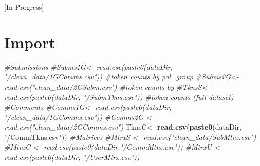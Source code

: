 \documentclass[
]{book}
\newenvironment{Shaded}{\begin{snugshade}}{\end{snugshade}}
\newcommand{\CommentTok}[1]{\textcolor[rgb]{0.56,0.35,0.01}{\textit{#1}}}
\newcommand{\DataTypeTok}[1]{\textcolor[rgb]{0.13,0.29,0.53}{#1}}
\newcommand{\KeywordTok}[1]{\textcolor[rgb]{0.13,0.29,0.53}{\textbf{#1}}}
\newcommand{\NormalTok}[1]{#1}
\newcommand{\OperatorTok}[1]{\textcolor[rgb]{0.81,0.36,0.00}{\textbf{#1}}}
\newcommand{\OtherTok}[1]{\textcolor[rgb]{0.56,0.35,0.01}{#1}}
\newcommand{\StringTok}[1]{\textcolor[rgb]{0.31,0.60,0.02}{#1}}
\begin{document}
{[}In-Progress{]}

\begin{Shaded}
\end{Shaded}

\hypertarget{import}{%
\section{Import}\label{import}}

\begin{Shaded}
\begin{Highlighting}[]
\CommentTok{#Submissions}
\CommentTok{#Subms1G<- read.csv(paste0(dataDir, "/clean_data/1GComms.csv")) #token counts by pol_group}
\CommentTok{#Subms2G<- read.csv("clean_data/2GSubm.csv") #token counts by }
\CommentTok{#TknsS<- read.csv(paste0(dataDir, "/SubmTkns.csv")) #token counts (full dataset)}
\CommentTok{#Comments}
\CommentTok{#Comms1G<- read.csv(paste0(dataDir, "/clean_data/1GComms.csv"))}
\CommentTok{#Comms2G <- read.csv("clean_data/2GComms.csv")}
\NormalTok{TknsC<-}\StringTok{ }\KeywordTok{read.csv}\NormalTok{(}\KeywordTok{paste0}\NormalTok{(dataDir, }\StringTok{"/CommTkns.csv"}\NormalTok{))}
\CommentTok{#Matrices}
\CommentTok{#MtrxS <- read.csv("clean_data/SubMtrx.csv")}
\CommentTok{#MtrxC <- read.csv(paste0(dataDir,"/CommMtrx.csv"))}
\CommentTok{#MtrxU <- read.csv(paste0(dataDir, "/UserMtrx.csv"))}
\end{Highlighting}
\end{Shaded}
\end{document}
